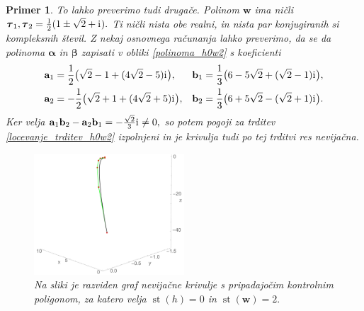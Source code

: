 \documentclass[12pt,a4paper,twoside]{article}
\newcommand{\iu}{\mathrm{i}\mkern1mu} %
\theoremstyle{definition} %
\theoremstyle{plain} %
\theoremstyle{primerstyle}
\newtheorem{primer}[definicija]{Primer}
\numberwithin{equation}{section}  %
\newcommand{\aV}{\mathbf{a}}
\newcommand{\bV}{\mathbf{b}}
\newcommand{\wV}{\mathbf{w}}
\newcommand{\balpha}{\boldsymbol \alpha}
\newcommand{\bbeta}{\boldsymbol \beta}
\newcommand{\btau}{\boldsymbol \tau}
\DeclareMathOperator{\st}{st}
\begin{document}
\begin{primer}
	To lahko preverimo tudi drugače. Polinom $\wV$ ima ničli $\btau_1,\btau_2=\frac{1}{2}(1\pm\sqrt{2}+\iu).$ Ti ničli nista obe realni, in nista par konjugiranih si kompleksnih števil. Z nekaj osnovnega računanja lahko preverimo, da se da polinoma $\balpha$ in $\bbeta$ zapisati v obliki \eqref{polinoma_h0w2} s koeficienti
	\begin{align*}
		\aV_1&=\frac{1}{2}\big(\sqrt{2}-1+(4\sqrt{2}-5)\iu\big),&\bV_1&=\frac{1}{3}\big(6-5\sqrt{2}+(\sqrt{2}-1)\iu\big),\\
		\aV_2&=-\frac{1}{2}\big(\sqrt{2}+1+(4\sqrt{2}+5)\iu\big),&\bV_2&=\frac{1}{3}\big(6+5\sqrt{2}-(\sqrt{2}+1)\iu\big).
	\end{align*}
	Ker velja $\aV_1\bV_2-\aV_2\bV_1=-\frac{\sqrt{2}}{3}\iu\neq 0,$ so potem pogoji za trditev \ref{locevanje_trditev_h0w2} izpolnjeni in je krivulja tudi po tej trditvi res nevijačna.
	\begin{figure}[h]
	  \centering
	  \includegraphics[width=0.5\textwidth]{images/h0w2_nevijacna.pdf}
	  \caption[Primer nevijačne krivulje ($\st(h)=0,$ $\st(\wV)=2$)]{Na sliki je razviden graf nevijačne krivulje s pripadajočim kontrolnim poligonom, za katero velja $\st(h)=0$ in $\st(\wV)=2.$}
	  \label{fig:h0w2_nevijacna}
	\end{figure}
\end{primer}
\end{document}
